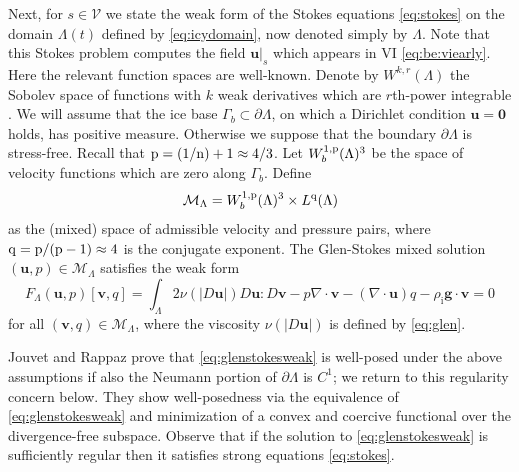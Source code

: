 \documentclass[hidelinks,onefignum,onetabnum,final]{siamart220329}  %
\newcommand{\Div}{\nabla\cdot}
\newcommand{\bg}{\mathbf{g}}
\newcommand{\bu}{\mathbf{u}}
\newcommand{\bv}{\mathbf{v}}
\newcommand{\bzero}{\bm{0}}
\newcommand{\cV}{\mathcal{V}}
\newcommand{\nn}{{\text{\textnormal{n}}}}
\newcommand{\pp}{{\text{\textnormal{p}}}}
\newcommand{\qq}{{\text{\textnormal{q}}}}
\newcommand{\rhoi}{\rho_{\text{i}}}
\begin{document}
Next, for $s\in \cV$ we state the weak form of the Stokes equations \eqref{eq:stokes} on the domain $\Lambda(t)$ defined by \eqref{eq:icydomain}, now denoted simply by $\Lambda$.  Note that this Stokes problem computes the field $\bu|_s$ which appears in VI \eqref{eq:be:viearly}.  Here the relevant function spaces are well-known.  Denote by $W^{k,r}(\Lambda)$ the Sobolev space of functions with $k$ weak derivatives which are $r$th-power integrable \cite{Evans2010}.  We will assume that the ice base $\Gamma_b\subset\partial \Lambda$, on which a Dirichlet condition $\bu=\bzero$ holds, has positive measure.  Otherwise we suppose that the boundary $\partial \Lambda$ is stress-free.  Recall that $\pp=(1/\nn)+1\approx 4/3$.  Let $W_b^{1,\pp}(\Lambda)^{3}$ be the space of velocity functions which are zero along $\Gamma_b$.  Define
\begin{equation}
\mathcal{M}_\Lambda = W_b^{1,\pp}(\Lambda)^3 \times L^\qq(\Lambda)  \label{eq:mixed}
\end{equation}
as the (mixed) space of admissible velocity and pressure pairs, where $\qq=\pp/(\pp-1)\approx 4$ is the conjugate exponent.  The Glen-Stokes mixed solution $(\bu,p) \in \mathcal{M}_\Lambda$ satisfies the weak form
\begin{equation}
F_\Lambda(\bu,p)[\bv,q] = \int_\Lambda 2 \nu(|D\bu|) D\bu : D\bv - p \Div\bv - (\Div\bu) q - \rhoi \bg \cdot \bv = 0 \label{eq:glenstokesweak}
\end{equation}
for all $(\bv,q) \in \mathcal{M}_\Lambda$, where the viscosity $\nu(|D\bu|)$ is defined by \eqref{eq:glen}.

Jouvet and Rappaz \cite{JouvetRappaz2011} prove that \eqref{eq:glenstokesweak} is well-posed under the above assumptions if also the Neumann portion of $\partial\Lambda$ is $C^1$; we return to this regularity concern below.  They show well-posedness via the equivalence of \eqref{eq:glenstokesweak} and minimization of a convex and coercive functional over the divergence-free subspace.  Observe that if the solution to \eqref{eq:glenstokesweak} is sufficiently regular then it satisfies strong equations \eqref{eq:stokes}.
\end{document}
